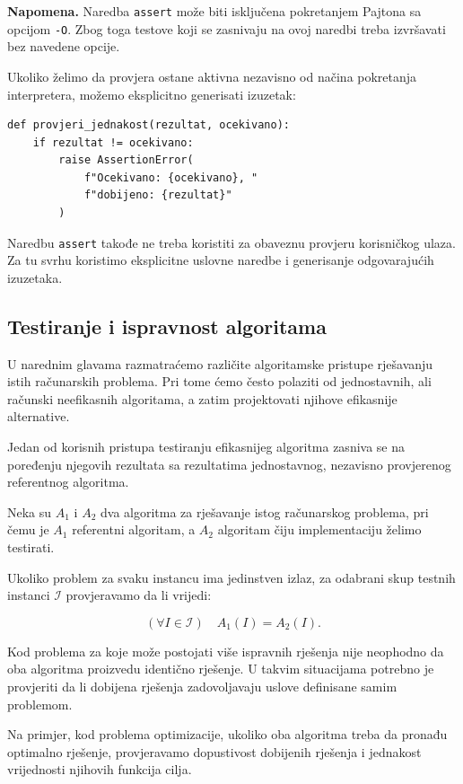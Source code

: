 \textbf{Napomena.} Naredba \texttt{assert} može biti 
isključena pokretanjem Pajtona sa opcijom \texttt{-O}. 
Zbog toga testove koji se zasnivaju na ovoj naredbi 
treba izvršavati bez navedene opcije.

Ukoliko želimo da provjera ostane aktivna nezavisno 
od načina pokretanja interpretera, možemo eksplicitno 
generisati izuzetak:

\begin{verbatim}
def provjeri_jednakost(rezultat, ocekivano):
    if rezultat != ocekivano:
        raise AssertionError(
            f"Ocekivano: {ocekivano}, "
            f"dobijeno: {rezultat}"
        )
\end{verbatim}

Naredbu \texttt{assert} takođe ne treba koristiti 
za obaveznu provjeru korisničkog ulaza. Za tu svrhu 
koristimo eksplicitne uslovne naredbe i generisanje 
odgovarajućih izuzetaka.


\subsection{Testiranje i ispravnost algoritama}

U narednim glavama razmatraćemo različite algoritamske 
pristupe rješavanju istih računarskih problema. 
Pri tome ćemo često polaziti od jednostavnih, ali 
računski neefikasnih algoritama, a zatim projektovati 
njihove efikasnije alternative.

Jedan od korisnih pristupa testiranju efikasnijeg 
algoritma zasniva se na poređenju njegovih rezultata 
sa rezultatima jednostavnog, nezavisno provjerenog 
referentnog algoritma.

Neka su $A_1$ i $A_2$ dva algoritma za rješavanje 
istog računarskog problema, pri čemu je $A_1$ 
referentni algoritam, a $A_2$ algoritam čiju 
implementaciju želimo testirati.

Ukoliko problem za svaku instancu ima jedinstven 
izlaz, za odabrani skup testnih instanci 
$\mathcal{I}$ provjeravamo da li vrijedi:

\[
(\forall I\in\mathcal{I})\quad
A_1(I)=A_2(I).
\]

Kod problema za koje može postojati više ispravnih 
rješenja nije neophodno da oba algoritma proizvedu 
identično rješenje. U takvim situacijama potrebno 
je provjeriti da li dobijena rješenja zadovoljavaju 
uslove definisane samim problemom.

Na primjer, kod problema optimizacije, ukoliko oba 
algoritma treba da pronađu optimalno rješenje, 
provjeravamo dopustivost dobijenih rješenja i 
jednakost vrijednosti njihovih funkcija cilja.

